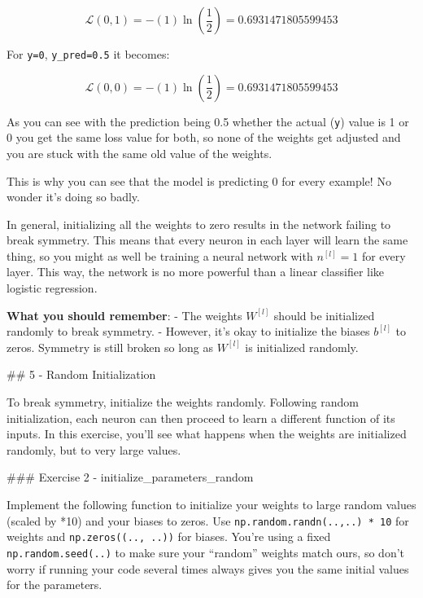 \documentclass[11pt]{article}
\begin{document}
\[ \mathcal{L}(0, 1) =  - (1)  \ln(\frac{1}{2}) = 0.6931471805599453\]

For \texttt{y=0}, \texttt{y\_pred=0.5} it becomes:

\[ \mathcal{L}(0, 0) =  - (1)  \ln(\frac{1}{2}) = 0.6931471805599453\]

As you can see with the prediction being 0.5 whether the actual
(\texttt{y}) value is 1 or 0 you get the same loss value for both, so
none of the weights get adjusted and you are stuck with the same old
value of the weights.

This is why you can see that the model is predicting 0 for every
example! No wonder it's doing so badly.

In general, initializing all the weights to zero results in the network
failing to break symmetry. This means that every neuron in each layer
will learn the same thing, so you might as well be training a neural
network with \(n^{[l]}=1\) for every layer. This way, the network is no
more powerful than a linear classifier like logistic regression.

    \textbf{What you should remember}: - The weights \(W^{[l]}\) should be
initialized randomly to break symmetry. - However, it's okay to
initialize the biases \(b^{[l]}\) to zeros. Symmetry is still broken so
long as \(W^{[l]}\) is initialized randomly.

    \#\# 5 - Random Initialization

To break symmetry, initialize the weights randomly. Following random
initialization, each neuron can then proceed to learn a different
function of its inputs. In this exercise, you'll see what happens when
the weights are initialized randomly, but to very large values.

\#\#\# Exercise 2 - initialize\_parameters\_random

Implement the following function to initialize your weights to large
random values (scaled by *10) and your biases to zeros. Use
\texttt{np.random.randn(..,..)\ *\ 10} for weights and
\texttt{np.zeros((..,\ ..))} for biases. You're using a fixed
\texttt{np.random.seed(..)} to make sure your ``random'' weights match
ours, so don't worry if running your code several times always gives you
the same initial values for the parameters.
\end{document}
